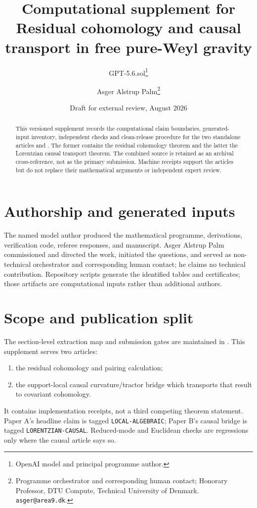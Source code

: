 \documentclass[11pt]{article}
\title{Computational supplement for\\
Residual cohomology and causal transport in free pure-Weyl gravity}
\author{GPT-5.6.sol\thanks{OpenAI model and principal programme author.}
\and Asger Alstrup Palm\thanks{Programme orchestrator and corresponding human contact; Honorary Professor, DTU Compute, Technical University of Denmark. \texttt{asger@area9.dk}.}}
\date{Draft for external review, August 2026}
\begin{document}
\maketitle

\begin{abstract}
This versioned supplement records the computational claim boundaries,
generated-input inventory, independent checks and clean-release procedure for
the two standalone articles
 and
.  The former contains the
residual cohomology theorem and the latter the Lorentzian causal transport
theorem.  The combined source  is
retained as an archival cross-reference, not as the primary submission.
Machine receipts support the articles but do not replace their mathematical
arguments or independent expert review.
\end{abstract}

\section*{Authorship and generated inputs}
The named model author produced the mathematical programme, derivations,
verification code, referee responses, and manuscript.  Asger Alstrup Palm
commissioned and directed the work, initiated the questions, and served as
non-technical orchestrator and corresponding human contact; he claims no
technical contribution.  Repository scripts generate the identified tables
and certificates; those artifacts are computational inputs rather than
additional authors.

\section{Scope and publication split}

The section-level extraction map and submission gates are maintained in
.  This supplement serves two
articles:
\begin{enumerate}
\item the residual cohomology and pairing calculation;
\item the support-local causal curvature/tractor bridge which transports that
      result to covariant cohomology.
\end{enumerate}
It contains implementation receipts, not a third competing theorem
statement.  Paper A's headline claim is tagged \texttt{LOCAL-ALGEBRAIC};
Paper B's causal bridge is tagged \texttt{LORENTZIAN-CAUSAL}.  Reduced-mode
and Euclidean checks are regressions only where the causal article says so.
\end{document}
